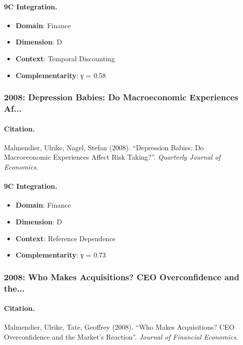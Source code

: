 \paragraph{9C Integration.}
\begin{itemize}[nosep]
  \item \textbf{Domain}: Finance
  \item \textbf{Dimension}: D
  \item \textbf{Context}: Temporal Discounting
  \item \textbf{Complementarity}: γ = 0.58
\end{itemize}


\subsubsection{2008: Depression Babies: Do Macroeconomic Experiences Af...}

\paragraph{Citation.}
Malmendier, Ulrike, Nagel, Stefan (2008). ``Depression Babies: Do Macroeconomic Experiences Affect Risk Taking?''. \textit{Quarterly Journal of Economics}.

\paragraph{9C Integration.}
\begin{itemize}[nosep]
  \item \textbf{Domain}: Finance
  \item \textbf{Dimension}: D
  \item \textbf{Context}: Reference Dependence
  \item \textbf{Complementarity}: γ = 0.73
\end{itemize}


\subsubsection{2008: Who Makes Acquisitions? CEO Overconfidence and the...}

\paragraph{Citation.}
Malmendier, Ulrike, Tate, Geoffrey (2008). ``Who Makes Acquisitions? CEO Overconfidence and the Market's Reaction''. \textit{Journal of Financial Economics}.

